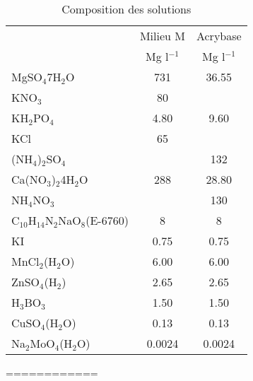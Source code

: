 \documentclass{sn-jnl}%
\begin{document}
	\begin{table}[h]
		\caption{Composition des solutions}
		\begin{tabular}{@{}lSS@{}}
			\toprule
			& {Milieu M} & {Acrybase}\\
			& {Mg l$ ^{-1} $} &{Mg l$ ^{-1} $} \\
			\midrule
			{MgSO$ _{4} $\textperiodcentered 7H$ _{2} $O}& 731 & 36.55 \\
			{KNO$ _{3} $} & 80 &  \\
			{KH$ _{2} $PO$ _{4} $} & 4.80 & 9.60\\
			{KCl} & 65 & \\
			{(NH$ _{4} $)$ _{2} $SO$ _{4} $} & & 132\\
			{Ca(NO$ _{3} $)$ _{2} $\textperiodcentered 4H$ _{2} $O} & 288 & 28.80 \\
			{NH$ _{4} $NO$ _{3} $} & & 130\\
			\midrule
			{C$ _{10} $H$ _{14} $N$ _{2} $NaO$ _{8} $(E-6760)} & 8 & 8 \\
			KI &0.75 & 0.75 \\
			{MnCl$ _{2} $(H$ _{2} $O)} & 6.00& 6.00 \\
			{ZnSO$ _{4} $(H$ _{2} $)} & 2.65& 2.65\\
			{H$ _{3} $BO$ _{3} $} & 1.50 & 1.50 \\
			{CuSO$ _{4} $(H$ _{2} $O)} & 0.13& 0.13\\
			{Na$ _{2} $MoO$ _{4} $(H$ _{2} $O)}& 0.0024 & 0.0024 \\
			\bottomrule
		\end{tabular}


	\end{table}





	============%

\end{document}
